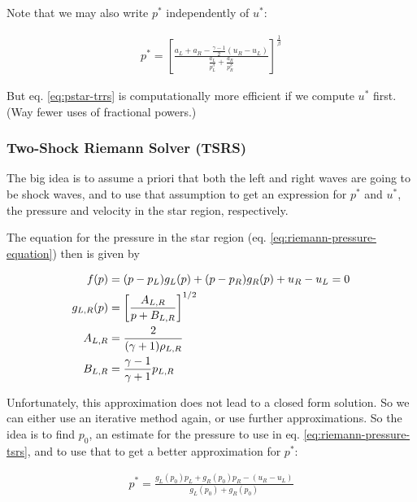 Note that we may also write $p^*$ independently of $u^*$:

\begin{align}
	p^* = 
		\left[ 
			\frac{ a_L + a_R - \frac{\gamma - 1}{2} (u_R - u_L)}{\frac{a_L}{p_L^\beta} + \frac{a_R}{p_R^\beta}}
		\right] ^ \frac{1}{\beta}
\end{align}

But eq. \ref{eq:pstar-trrs} is computationally more efficient if we compute $u^*$ first. (Way fewer uses of fractional powers.)















\subsubsection{Two-Shock Riemann Solver (TSRS)}


The big idea is to assume a priori that both the left and right waves are going to be shock waves, and to use that assumption to get an expression for $p^*$ and $u^*$, the pressure and velocity in the star region, respectively.


The equation for the pressure in the star region (eq. \ref{eq:riemann-pressure-equation}) then is given by

\begin{align}
	f(p) &= (p - p_L) g_L(p) + (p - p_R) g_R(p) + u_R - u_L = 0 \label{eq:riemann-pressure-tsrs} \\
	g_{L,R}(p) &= \left[ \frac{A_{L,R}}{p + B_{L,R}} \right] ^{1/2} \\
	A_{L,R} &= 
		\frac{2}{(\gamma + 1) \rho_{L,R}}\\
	B_{L,R} &= 
		\frac{\gamma - 1}{\gamma + 1} p_{L,R}
\end{align}

Unfortunately, this approximation does not lead to a closed form solution.
So we can either use an iterative method again, or use further approximations.
So the idea is to find $p_0$, an estimate for the pressure to use in eq. \ref{eq:riemann-pressure-tsrs}, and to use that to get a better approximation for $p^*$:

\begin{align*}
	p^* = \frac{g_L(p_0) p_L + g_R(p_0)p_R - (u_R - u_L)}{g_L(p_0) + g_R(p_0)}
\end{align*}

